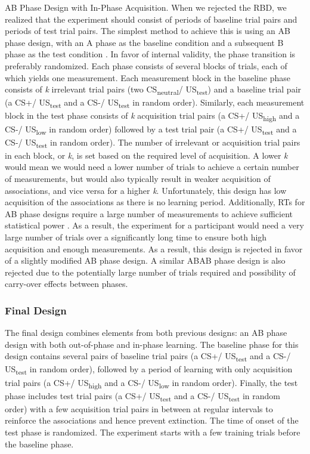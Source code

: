 \documentclass{article}
\begin{document}
AB Phase Design with In-Phase Acquisition. When we rejected the RBD, we realized that the experiment should consist of periods of baseline trial pairs and periods of test trial pairs. The simplest method to achieve this is using an AB phase design, with an A phase as the baseline condition and a subsequent B phase as the test condition \autocite{bib9}. In favor of internal validity, the phase transition is preferably randomized. Each phase consists of several blocks of trials, each of which yields one measurement. Each measurement block in the baseline phase consists of \emph{k} irrelevant trial pairs (two CS\textsubscript{neutral}/ US\textsubscript{test}) and a baseline trial pair (a CS+/ US\textsubscript{test} and a CS-/ US\textsubscript{test} in random order). Similarly, each measurement block in the test phase consists of \emph{k} acquisition trial pairs (a CS+/ US\textsubscript{high} and a CS-/ US\textsubscript{low} in random order) followed by a test trial pair (a CS+/ US\textsubscript{test} and a CS-/ US\textsubscript{test} in random order). The number of irrelevant or acquisition trial pairs in each block, or \emph{k}, is set based on the required level of acquisition. A lower \emph{k} would mean we would need a lower number of trials to achieve a certain number of measurements, but would also typically result in weaker acquisition of associations, and vice versa for a higher \emph{k}. Unfortunately, this design has low acquisition of the associations as there is no learning period. Additionally, RTs for AB phase designs require a large number of measurements to achieve sufficient statistical power \autocite{bib46} \autocite{bib18}. As a result, the experiment for a participant would need a very large number of trials over a significantly long time to ensure both high acquisition and enough measurements. As a result, this design is rejected in favor of a slightly modified AB phase design. A similar ABAB phase design is also rejected due to the potentially large number of trials required and possibility of carry-over effects between phases. 

\subsubsection{Final Design} 

The final design combines elements from both previous designs: an AB phase design with both out-of-phase and in-phase learning. The baseline phase for this design contains several pairs of baseline trial pairs (a CS+/ US\textsubscript{test} and a CS-/ US\textsubscript{test} in random order), followed by a period of learning with only acquisition trial pairs (a CS+/ US\textsubscript{high} and a CS-/ US\textsubscript{low} in random order). Finally, the test phase includes test trial pairs (a CS+/ US\textsubscript{test} and a CS-/ US\textsubscript{test} in random order) with a few acquisition trial pairs in between at regular intervals to reinforce the associations and hence prevent extinction. The time of onset of the test phase is randomized. The experiment starts with a few training trials before the baseline phase. 
\end{document}
